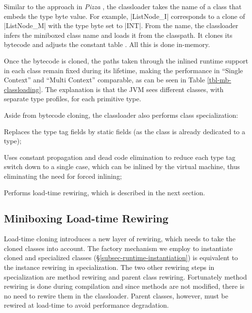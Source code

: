  Similar to the approach in {\em Pizza} \cite{pizza}, the classloader takes the name of a class that embeds the type byte value. For example, |ListNode_I| corresponds to a clone of |ListNode_M| with the type byte set to |INT|. From the name, the classloader infers the miniboxed class name and loads it from the classpath. It clones its bytecode and adjusts the constant table \cite{jsr-202}. All this is done in-memory. 

Once the bytecode is cloned, the paths taken through the inlined runtime support in each class remain fixed during its lifetime, making the performance in ``Single Context'' and ``Multi Context'' comparable, as can be seen in Table \ref{tbl-mb-classloading}. The explanation is that the JVM sees different classes, with separate type profiles, for each primitive type.  

Aside from bytecode cloning, the classloader also performs class specialization:
\begin{packed_item}
\item Replaces the type tag fields by static fields (as the class is already dedicated to a type);
\item Uses constant propagation and dead code elimination to reduce each type tag switch down to a single case, which can be inlined by the virtual machine, thus eliminating the need for forced inlining;
\item Performs load-time rewiring, which is described in the next section. 
\end{packed_item} 

\subsection{Miniboxing Load-time Rewiring}
\label{subsec-runtime-rewiring}

 Load-time cloning introduces a new layer of rewiring, which needs to take the cloned classes into account. The factory mechanism we employ to instantiate cloned and specialized classes (\S\ref{subsec-runtime-instantiation}) is equivalent to the instance rewiring in specialization. The two other rewiring steps in specialization are method rewiring and parent class rewiring. Fortunately method rewiring is done during compilation and since methods are not modified, there is no need to rewire them in the classloader. Parent classes, however, must be rewired at load-time to avoid performance degradation.  

